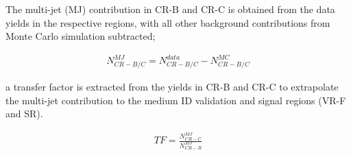 
The multi-jet (MJ) contribution in CR-B and CR-C is obtained from the data yields in the respective regions,  with all other background contributions from Monte Carlo simulation subtracted;

\begin{align}
N^{MJ}_{CR-B/C} =  N^{data}_{CR-B/C} - N^{MC}_{CR-B/C} 
\end{align}

a transfer factor is extracted from the yields in CR-B and CR-C to extrapolate the multi-jet contribution to the medium ID validation and signal regions (VR-F and SR). 

\begin{align}
TF = \frac{N^{MJ}_{CR-C}}{N^{MJ}_{CR-B}}
\label{eq:bkgestimation:TF}
\end{align}

